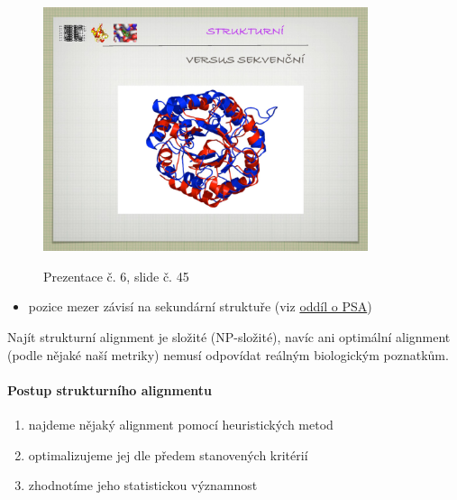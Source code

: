 \documentclass[DIV=8]{scrreprt}
\begin{document}
\begin{itemize}[nosep]
\begin{figure}
    \centering
    \label{slides-6-slide-43}
\end{figure}
\begin{figure}
    \caption{Prezentace č. 6, slide č. 45}
    \includegraphics[width=0.85\textwidth]{slides-6/slide-45.jpg}
    \centering
    \label{slides-6-slide-45}
\end{figure}

\begin{itemize}[nosep]
    \item pozice mezer závisí na sekundární struktuře (viz \hyperref[Pairwise sequence alignment]{oddíl o PSA})
\end{itemize}

\end{itemize}



Najít strukturní alignment je složité (NP-složité), navíc ani optimální alignment (podle nějaké naší metriky) nemusí odpovídat reálným biologickým poznatkům.

\paragraph{Postup strukturního alignmentu}
\begin{enumerate}[nosep]
    \item najdeme nějaký alignment pomocí heuristických metod
    \item optimalizujeme jej dle předem stanovených kritérií
    \item zhodnotíme jeho statistickou významnost
\end{enumerate}
\end{document}
